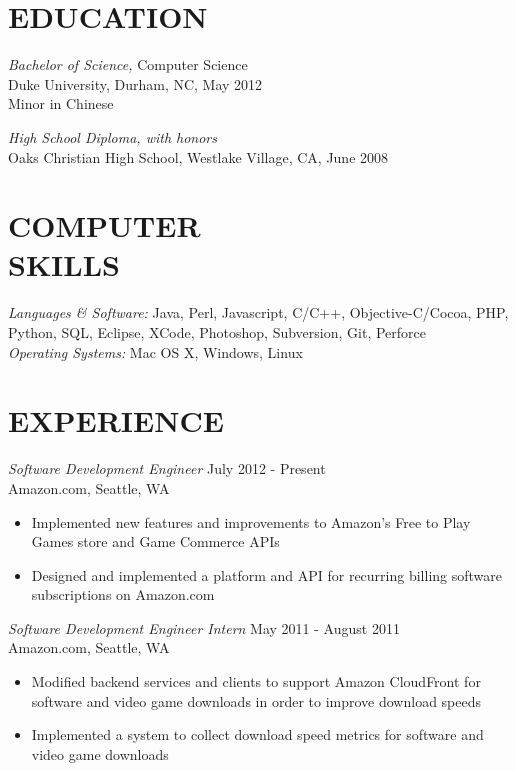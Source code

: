 \documentclass[line,margin]{res}
\begin{document}
    \setlength{\pdfpageheight}{\paperheight}
    \setlength{\pdfpagewidth}{\paperwidth}
\address{1000 Minor Ave. Apt. 305, Seattle, WA, 98104}
\address{alex@galonsky.com}

 
\begin{resume}
\section{EDUCATION} 
    {\sl Bachelor of Science,} Computer Science \\
    Duke University, Durham, NC, 
    May 2012 \\
    Minor in Chinese

    {\sl High School Diploma, with honors} \\
    Oaks Christian High School, Westlake Village, CA, June 2008
 
\section{COMPUTER \\ SKILLS} 
    {\sl Languages \& Software:} Java, Perl, Javascript, C/C++, Objective-C/Cocoa, PHP, Python, SQL, Eclipse, XCode, Photoshop, Subversion, Git, Perforce \\
    {\sl Operating Systems:} Mac OS X, Windows, Linux
 
\section{EXPERIENCE} 

    {\sl Software Development Engineer} \hfill July 2012 - Present \\
        Amazon.com, Seattle, WA
        \begin{itemize}  \itemsep -2pt %
            \item Implemented new features and improvements to Amazon's Free to Play Games store and Game Commerce APIs
            \item Designed and implemented a platform and API for recurring billing software subscriptions on Amazon.com
        \end{itemize}

    {\sl Software Development Engineer Intern} \hfill May 2011 - August 2011 \\
        Amazon.com, Seattle, WA
        \begin{itemize}  \itemsep -2pt %
            \item Modified backend services and clients to support Amazon CloudFront for software and video game downloads in order to improve download speeds
            \item Implemented a system to collect download speed metrics for software and video game downloads
        \end{itemize}


\end{resume}
\end{document}
